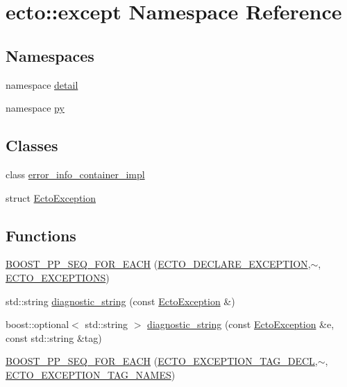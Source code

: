 \hypertarget{namespaceecto_1_1except}{\section{ecto\-:\-:except \-Namespace \-Reference}
\label{namespaceecto_1_1except}
}
\subsection*{\-Namespaces}
\begin{DoxyCompactItemize}
\item 
namespace \hyperlink{namespaceecto_1_1except_1_1detail}{detail}
\item 
namespace \hyperlink{namespaceecto_1_1except_1_1py}{py}
\end{DoxyCompactItemize}
\subsection*{\-Classes}
\begin{DoxyCompactItemize}
\item 
class \hyperlink{classecto_1_1except_1_1error__info__container__impl}{error\-\_\-info\-\_\-container\-\_\-impl}
\item 
struct \hyperlink{structecto_1_1except_1_1EctoException}{\-Ecto\-Exception}
\end{DoxyCompactItemize}
\subsection*{\-Functions}
\begin{DoxyCompactItemize}
\item 
\hyperlink{namespaceecto_1_1except_a6ed4b851e67551e870e933f85628cb6f}{\-B\-O\-O\-S\-T\-\_\-\-P\-P\-\_\-\-S\-E\-Q\-\_\-\-F\-O\-R\-\_\-\-E\-A\-C\-H} (\hyperlink{except_8hpp_a9b77695b9c45c36934e7c890ce6f682f}{\-E\-C\-T\-O\-\_\-\-D\-E\-C\-L\-A\-R\-E\-\_\-\-E\-X\-C\-E\-P\-T\-I\-O\-N},$\sim$, \hyperlink{except_8hpp_ad3bbab1baffa25e20db0635270c5f108}{\-E\-C\-T\-O\-\_\-\-E\-X\-C\-E\-P\-T\-I\-O\-N\-S})
\item 
std\-::string \hyperlink{namespaceecto_1_1except_a8161938bf962eaf02d9b0e73b80a5c4a}{diagnostic\-\_\-string} (const \hyperlink{structecto_1_1except_1_1EctoException}{\-Ecto\-Exception} \&)
\item 
boost\-::optional$<$ std\-::string $>$ \hyperlink{namespaceecto_1_1except_abebe710f45e8d06b2df19d02bf15b193}{diagnostic\-\_\-string} (const \hyperlink{structecto_1_1except_1_1EctoException}{\-Ecto\-Exception} \&e, const std\-::string \&tag)
\item 
\hyperlink{namespaceecto_1_1except_a8744cfe3c8d4364696873aeb175c68b9}{\-B\-O\-O\-S\-T\-\_\-\-P\-P\-\_\-\-S\-E\-Q\-\_\-\-F\-O\-R\-\_\-\-E\-A\-C\-H} (\hyperlink{except_8hpp_a4a4f231e4fe0f923cd9ee3a48803ca30}{\-E\-C\-T\-O\-\_\-\-E\-X\-C\-E\-P\-T\-I\-O\-N\-\_\-\-T\-A\-G\-\_\-\-D\-E\-C\-L},$\sim$, \hyperlink{except_8hpp_a6a632b3827deba566cbca48b37bf53e2}{\-E\-C\-T\-O\-\_\-\-E\-X\-C\-E\-P\-T\-I\-O\-N\-\_\-\-T\-A\-G\-\_\-\-N\-A\-M\-E\-S})
\end{DoxyCompactItemize}


